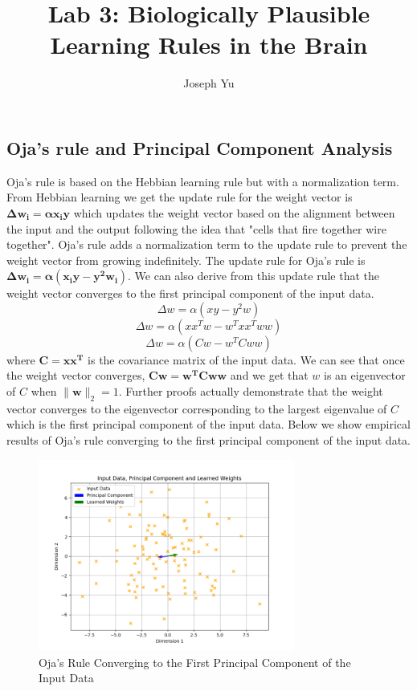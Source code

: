 \documentclass[12pt, letterpaper]{article}
\author{Joseph Yu}
\title{Lab 3: Biologically Plausible Learning Rules in the Brain}
\begin{document}
\maketitle
\setcounter{section}{3}
\subsection{Oja's rule and Principal Component Analysis}
Oja's rule is based on the Hebbian learning rule but with a normalization term. From Hebbian learning we get the update rule for the weight vector is $\mathbf{\Delta w_i = \alpha x_i y} $ which updates the weight vector based on the alignment between the input and the output following the idea that "cells that fire together wire together". Oja's rule adds a normalization term to the update rule to prevent the weight vector from growing indefinitely. The update rule for Oja's rule is $\mathbf{\Delta w_i = \alpha (x_i y - y^2 w_i)}$. We can also derive from this update rule that the weight vector converges to the first principal component of the input data.
\[ \Delta w = \alpha (x y - y^2 w) \]
\[ \Delta w = \alpha (x x^T w - w^T x x^T w w) \]
\[ \Delta w = \alpha (C w - w^T C w w) \] where $\mathbf{C = x x^T}$ is the covariance matrix of the input data. 
We can see that once the weight vector converges, $\mathbf{C w = w^T C w w}$ and we get that $w$ is an eigenvector of $C$ when $ \| \mathbf{w} \|_2 = 1$. Further proofs actually demonstrate that the weight vector converges to the eigenvector corresponding to the largest eigenvalue of $C$ which is the first principal component of the input data. Below we show empirical results of Oja's rule converging to the first principal component of the input data.


\begin{figure}[H]
    \centering
    \includegraphics[width=0.75\textwidth]{oja_rule.png}
    \caption{Oja's Rule Converging to the First Principal Component of the Input Data}
    \label{fig:oja_rule}
\end{figure}
\end{document}
